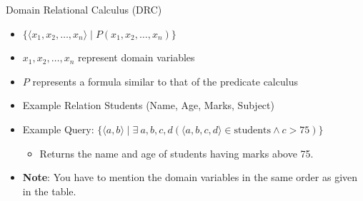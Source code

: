 \documentclass[aspectratio=169, xcolor=dvipsnames]{beamer}
\begin{document}
\begin{frame}{Domain Relational Calculus (DRC)}
    \begin{itemize}[<+->]
        \item $\{ \langle x_1, x_2, \dots, x_n \rangle \mid P(x_1, x_2, \dots, x_n) \}$
        \item $x_1, x_2, \dots, x_n$ represent domain variables
        \item $P$ represents a formula similar to that of the predicate calculus
        \item Example Relation Students (Name, Age, Marks, Subject)
        \item Example Query: $\{ \langle a, b \rangle \mid \exists\ a,b,c,d (\langle a,b,c,d \rangle \in \text{students} \land c > 75) \}$
        \begin{itemize}
            \item[$\triangleright$] Returns the name and age of students having marks above 75.
        \end{itemize}
        \item \textbf{Note}: You have to mention the domain variables in the same order as given in the table.
    \end{itemize}
\end{frame}
\end{document}
